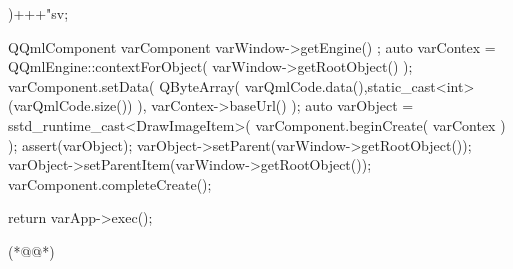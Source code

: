 \begin{thebookfilesourceone}[escapeinside={(*@}{@*)},
caption=GoodLuck,
title=\filesourcenumbernameone \thefilesourcenumber
]
{{{}

)+++"sv;

        QQmlComponent varComponent{ varWindow->getEngine() };
        auto varContex = QQmlEngine::contextForObject( varWindow->getRootObject() );
        varComponent.setData(
            QByteArray( varQmlCode.data(),static_cast<int>(varQmlCode.size()) ),
            varContex->baseUrl()
        );
        auto varObject = sstd_runtime_cast<DrawImageItem>(
            varComponent.beginCreate( varContex ) );
        assert(varObject);
        varObject->setParent(varWindow->getRootObject());
        varObject->setParentItem(varWindow->getRootObject());
        varComponent.completeCreate();

    }

    return varApp->exec();

}(*@\marginpar[\hfill\setlength\fboxsep{2pt}\fbox{\footnotesize{\kaishu\parbox{1em}{\setlength{\baselineskip}{2pt}\filesourcenumbernameone}}\footnotesize{\thefilesourcenumber}}]{\setlength\fboxsep{2pt}\fbox{\footnotesize{\kaishu\parbox{1em}{\setlength{\baselineskip}{2pt}\filesourcenumbernameone}}\footnotesize{\thefilesourcenumber}}}@*)\end{thebookfilesourceone}          %
\addtocounter{lstlisting}{-1}   %












